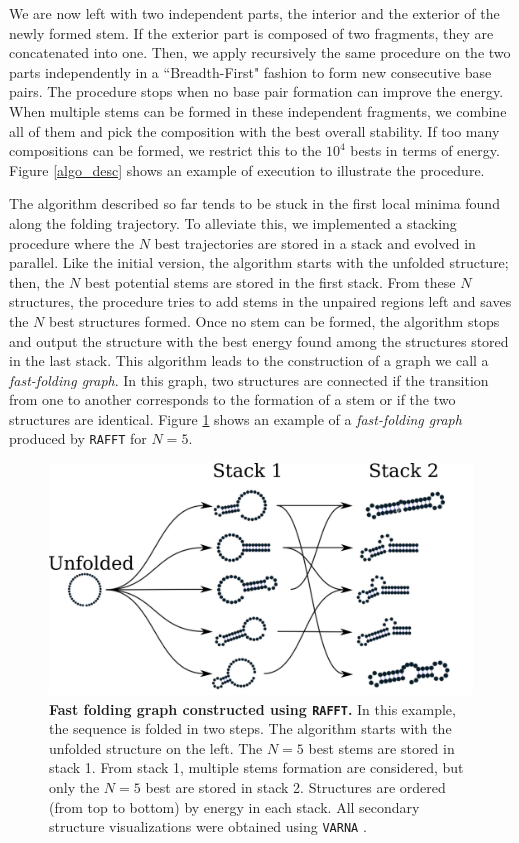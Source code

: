 We are now left with two independent parts, the interior and the exterior of the newly formed stem. If the exterior part is composed of two fragments, they are concatenated into one. Then, we apply recursively the same procedure on the two parts independently in a ``Breadth-First" fashion to form new consecutive base pairs. The procedure stops when no base pair formation can improve the energy. When multiple stems can be formed in these independent fragments, we combine all of them and pick the composition with the best overall stability. If too many compositions can be formed, we restrict this to the $10^4$ bests in terms of energy. Figure \ref{algo_desc} shows an example of execution to illustrate the procedure. 

The algorithm described so far tends to be stuck in the first local minima found along the folding trajectory. To alleviate this, we implemented a stacking procedure where the \(N\) best trajectories are stored in a stack and evolved in parallel. Like the initial version, the algorithm starts with the unfolded structure; then, the \(N\) best potential stems are stored in the first stack. From these \(N\) structures, the procedure tries to add stems in the unpaired regions left and saves the \(N\) best structures formed. Once no stem can be formed, the algorithm stops and output the structure with the best energy found among the structures stored in the last stack. This algorithm leads to the construction of a graph we call a \emph{fast-folding graph}. In this graph, two structures are connected if the transition from one to another corresponds to the formation of a stem or if the two structures are identical. Figure \ref{fast_path_graph} shows an example of a \emph{fast-folding graph} produced by \texttt{RAFFT} for $N=5$.


\begin{figure}[t!]
	\centering
	\includegraphics[width=1\linewidth]{../res/images/rafft/fast_paths_graph.png}
	\caption{\label{fast_path_graph}\textbf{Fast folding graph constructed using \texttt{RAFFT}.} In this example, the sequence is folded in two steps. The algorithm starts with the unfolded structure on the left. The \(N=5\) best stems are stored in stack 1. From stack 1, multiple stems formation are considered, but only the \(N=5\) best are stored in stack 2. Structures are ordered (from top to bottom) by energy in each stack. All secondary structure visualizations were obtained using \texttt{VARNA} \cite{darty09_varna}.}
\end{figure}
